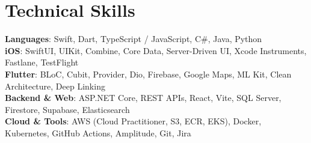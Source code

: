 \section{Technical Skills}
\begin{itemize}[leftmargin=0.15in, label={}]
  \small{\item{
    \textbf{Languages}{: Swift, Dart, TypeScript / JavaScript, C\#, Java, Python} \\[1mm]
    \textbf{iOS}{: SwiftUI, UIKit, Combine, Core Data, Server-Driven UI, Xcode Instruments, Fastlane, TestFlight} \\[1mm]
    \textbf{Flutter}{: BLoC, Cubit, Provider, Dio, Firebase, Google Maps, ML Kit, Clean Architecture, Deep Linking} \\[1mm]
    \textbf{Backend \& Web}{: ASP.NET Core, REST APIs, React, Vite, SQL Server, Firestore, Supabase, Elasticsearch} \\[1mm]
    \textbf{Cloud \& Tools}{: AWS (Cloud Practitioner, S3, ECR, EKS), Docker, Kubernetes, GitHub Actions, Amplitude, Git, Jira}
  }}
\end{itemize}
\vspace{-14pt}
